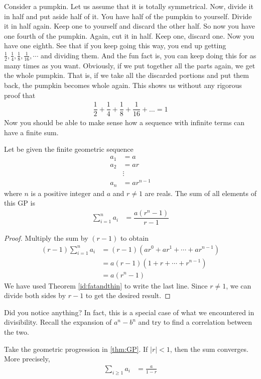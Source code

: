 \documentclass{subfile}
\begin{document}
	Consider a pumpkin. Let us assume that it is totally symmetrical. Now, divide it in half and put aside half of it. You have half of the pumpkin to yourself. Divide it in half again. Keep one to yourself and discard the other half. So now you have one fourth of the pumpkin. Again, cut it in half. Keep one, discard one. Now you have one eighth. See that if you keep going this way, you end up getting $\frac{1}{2},\frac{1}{4},\frac{1}{8},\frac{1}{16},\cdots$ and dividing them. And the fun fact is, you can keep doing this for as many times as you want. Obviously, if we put together all the parts again, we get the whole pumpkin. That is, if we take all the discarded portions and put them back, the pumpkin becomes whole again. This shows us without any rigorous proof that
		\begin{align*}
			\dfrac{1}{2}+\dfrac{1}{4}+\dfrac{1}{8}+\dfrac{1}{16}+\ldots=1
		\end{align*}
	Now you should be able to make sense how a sequence with infinite terms can have a finite sum.
		\begin{theorem}\label{thm:GP}
			Let be given the finite geometric sequence
				\begin{align*}
					a_1 & = a\\
					a_2 & = ar\\
					& \vdots\\
					a_n & = ar^{n-1}
				\end{align*}
			where $n$ is a positive integer and $a$ and $r \neq 1$ are reals. The sum of all elements of this GP is
				\begin{align*}
					\sum_{i=1}^{n} a_i &= \dfrac{a \left(r^n-1\right)}{r-1}
				\end{align*}
		\end{theorem}

		\begin{proof}
			Multiply the sum by $(r-1)$ to obtain
				\begin{align*}
					(r-1)\sum_{i=1}^{n} a_i &= (r-1)(ar^0 + ar^1 + \cdots + ar^{n-1})\\
											&= a(r-1)(1+r+ \cdots + r^{n-1})\\
											&= a(r^n -1)
				\end{align*}
			We have used Theorem \ref{id:fatandthin} to write the last line. Since $r \neq 1$, we can divide both sides by $r-1$ to get the desired result.
		\end{proof}
	Did you notice anything? In fact, this is a special case of what we encountered in divisibility. Recall the expansion of $a^n-b^n$ and try to find a correlation between the two.
		\begin{corollary}
			Take the geometric progression in \autoref{thm:GP}. If $|r|<1$, then the sum converges. More precisely,
				\begin{align*}
					\sum_{i\geq1} a_i &= \frac{a}{1-r}
				\end{align*}
		\end{corollary}
\end{document}
